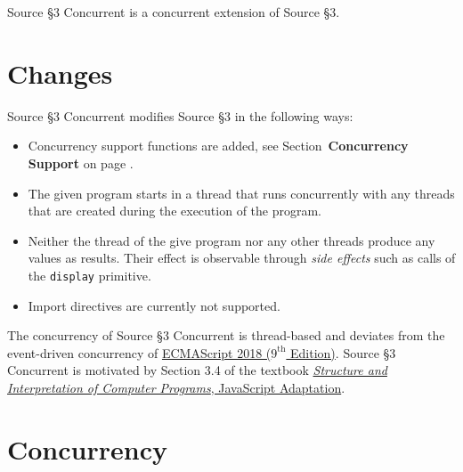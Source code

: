 





Source \S 3 Concurrent is a concurrent extension of Source \S 3.

\section{Changes}

Source \S 3 Concurrent modifies Source \S 3 in the following ways:
\begin{itemize}
\item Concurrency support functions are added, see Section~\textbf{Concurrency Support} on page \pageref{conc_supp}.
\item The given program starts in a thread that runs concurrently with any
  threads that are created during the execution of the program.
\item Neither the thread of the give program nor any other threads produce
  any values as results. Their effect is observable through \emph{side effects}
  such as calls of the \lstinline{display} primitive.
  \item Import directives are currently not supported.
\end{itemize}
\noindent
The concurrency of Source \S 3 Concurrent is thread-based and deviates
from the event-driven concurrency of  
\href{http://www.ecma-international.org/publications/files/ECMA-ST/Ecma-262.pdf}{\color{DarkBlue}
  ECMAScript 2018 ($9^{\textrm{th}}$ Edition)}. Source \S 3 Concurrent is
motivated by Section 3.4 of the textbook
\href{https://sicp.comp.nus.edu.sg}{\color{DarkBlue}\emph{Structure and Interpretation
of Computer Programs}, JavaScript Adaptation}.

\section{Concurrency}

